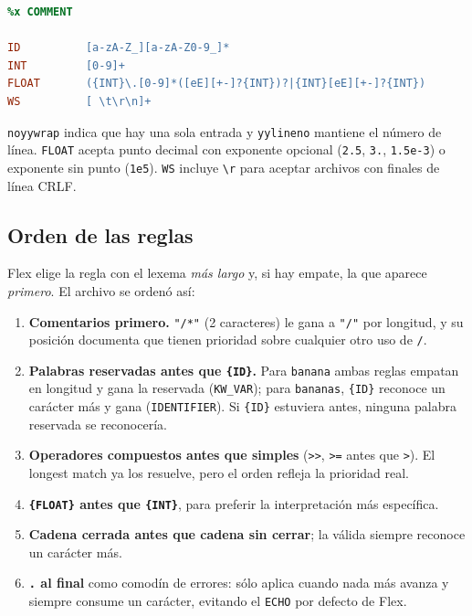 \documentclass[11pt,letterpaper]{article}
\newcommand{\code}[1]{\texttt{#1}}
\begin{document}
\begin{lstlisting}[language=flex,caption={Opciones, condición de inicio y definiciones regulares.}]
%option noyywrap yylineno
%x COMMENT

ID          [a-zA-Z_][a-zA-Z0-9_]*
INT         [0-9]+
FLOAT       ({INT}\.[0-9]*([eE][+-]?{INT})?|{INT}[eE][+-]?{INT})
WS          [ \t\r\n]+
\end{lstlisting}

\code{noyywrap} indica que hay una sola entrada y \code{yylineno} mantiene el número de línea. \code{FLOAT} acepta punto decimal con exponente opcional (\code{2.5}, \code{3.}, \code{1.5e-3}) o exponente sin punto (\code{1e5}). \code{WS} incluye \code{\textbackslash r} para aceptar archivos con finales de línea CRLF.

\subsection{Orden de las reglas}

Flex elige la regla con el lexema \emph{más largo} y, si hay empate, la que aparece \emph{primero}. El archivo se ordenó así:

\begin{enumerate}[label=\arabic*.]
  \item \textbf{Comentarios primero.} \code{"/*"} (2 caracteres) le gana a \code{"/"} por longitud, y su posición documenta que tienen prioridad sobre cualquier otro uso de \code{/}.
  \item \textbf{Palabras reservadas antes que \code{\{ID\}}.} Para \code{banana} ambas reglas empatan en longitud y gana la reservada (\code{KW\_VAR}); para \code{bananas}, \code{\{ID\}} reconoce un carácter más y gana (\code{IDENTIFIER}). Si \code{\{ID\}} estuviera antes, ninguna palabra reservada se reconocería.
  \item \textbf{Operadores compuestos antes que simples} (\code{>{}>}, \code{>=} antes que \code{>}). El longest match ya los resuelve, pero el orden refleja la prioridad real.
  \item \textbf{\code{\{FLOAT\}} antes que \code{\{INT\}}}, para preferir la interpretación más específica.
  \item \textbf{Cadena cerrada antes que cadena sin cerrar}; la válida siempre reconoce un carácter más.
  \item \textbf{\code{.} al final} como comodín de errores: sólo aplica cuando nada más avanza y siempre consume un carácter, evitando el \code{ECHO} por defecto de Flex.
\end{enumerate}
\end{document}
